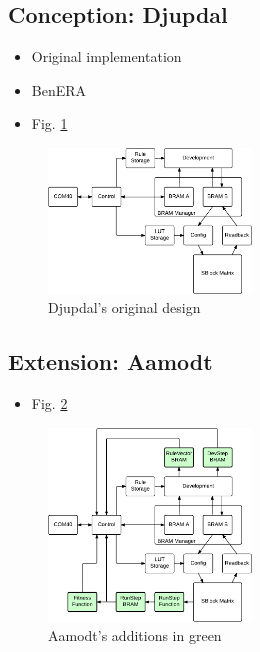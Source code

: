 \subsection{Conception: Djupdal \cite{djupdal2003sblock}}

\begin{itemize}
    \item Original implementation
    \item BenERA
    \item Fig. \ref{fig:overview-djupdal}
\end{itemize}

\begin{figure}[!ht]
    \centering
    \includegraphics[width=0.48\textwidth]{figures/overview-djupdal}
    \caption{Djupdal's original design}
    \label{fig:overview-djupdal}
\end{figure}

\subsection{Extension: Aamodt \cite{aamodt2005sblock}}

\begin{itemize}
    \item Fig. \ref{fig:overview-aamodt}
\end{itemize}

\begin{figure}[!ht]
    \centering
    \includegraphics[width=0.48\textwidth]{figures/overview-aamodt}
    \caption{Aamodt's additions in green}
    \label{fig:overview-aamodt}
\end{figure}

